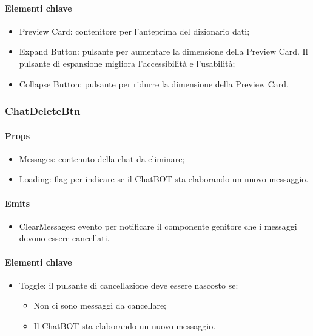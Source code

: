 \paragraph*{Elementi chiave}
\begin{itemize}
  \item Preview Card: contenitore per l'anteprima del dizionario dati;
  \item Expand Button: pulsante per aumentare la dimensione della Preview Card. Il pulsante di espansione migliora l'accessibilità e l'usabilità;
  \item Collapse Button: pulsante per ridurre la dimensione della Preview Card.
\end{itemize}

\subsubsection{ChatDeleteBtn}

\paragraph*{Props}
\begin{itemize}
  \item Messages: contenuto della chat da eliminare;
  \item Loading: flag per indicare se il ChatBOT sta elaborando un nuovo messaggio.
\end{itemize}

\paragraph*{Emits}
\begin{itemize}
  \item ClearMessages: evento per notificare il componente genitore che i messaggi devono essere cancellati.
\end{itemize}

\paragraph*{Elementi chiave}
\begin{itemize}
  \item Toggle: il pulsante di cancellazione deve essere nascosto se:
  \begin{itemize}
    \item Non ci sono messaggi da cancellare;
    \item Il ChatBOT sta elaborando un nuovo messaggio.
  \end{itemize}
\end{itemize}

